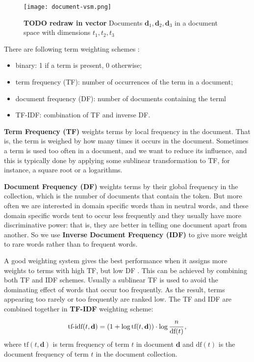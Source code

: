 \begin{figure}[h]
\centering\texttt{[image: document-vsm.png]}
\caption{\textbf{TODO redraw in vector} Documents $\mathbf d_1, \mathbf d_2, \mathbf d_3$ 
in a document space with dimensions $t_1, t_2, t_3$}
\label{fig:document-vsm}
\end{figure}


There are following term weighting schemes \cite{manning2008introduction}:

\begin{itemize}
\itemsep1pt\parskip0pt
  \item binary: 1 if a term is present, 0 otherwise;
  \item term frequency (TF): number of occurrences of the term in a document;
  \item document frequency (DF): number of documents containing the terml
  \item TF-IDF: combination of TF and inverse DF.
\end{itemize}


\textbf{Term Frequency (TF)} weights terms by local frequency in the document.
That is, the term is weighed by how many times it occurs in the document.
Sometimes a term is used too often in a document, and we want to 
reduce its influence, and this is typically done by applying some 
sublinear transformation to TF, for instance, a square root or a logarithms. 

\textbf{Document Frequency (DF)} weights terms by their global frequency
in the collection, which is the number of documents that contain the token.
But more often we are interested in domain specific words than in neutral words, 
and these domain specific words tent to occur less frequently and they usually 
have more discriminative power: that is, they are better in telling one document apart from another. So we use \textbf{Inverse Document Frequency (IDF)} to give more 
weight to rare words rather than to frequent words. 

A good weighting system gives the best performance when it assigns
more weights to terms with high TF, but low DF \cite{salton1988term}.
This can be achieved by combining both TF and IDF
schemes. Usually a sublinear TF is used to avoid the dominating effect of
words that occur too frequently. As the result, terms appearing
too rarely or too frequently are ranked low.
The TF and IDF are combined together in \textbf{TF-IDF} weighting scheme:
$$\text{tf-idf}(t, \mathbf d) = (1 + \log \text{tf}(t, \mathbf d)) \cdot \log \cfrac{n}{\text{df}(t)} \, ,$$
where $\text{tf}(t, \mathbf d)$ is term frequency of term $t$ in document 
$\mathbf d$ and $\text{df}(t)$ is the document frequency of term $t$ in 
the document collection.

